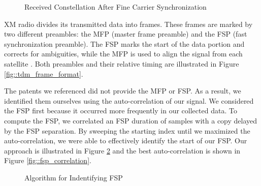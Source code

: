 \documentclass[conference,onecolumn]{IEEEtran}
\begin{document}
\begin{figure}[H]
	\centerline{}
	\caption{Received Constellation After Fine Carrier Synchronization}
	\label{fig::constellation_after_fine_carrier_comp}
\end{figure}

XM radio divides its transmitted data into frames. These frames are marked by two different preambles: the MFP (master frame preamble) and the FSP (fast synchronization preamble). The FSP marks the start of the data portion and corrects for ambiguities, while the MFP is used to align the signal from each satellite \cite{a2008_us8260192b2}. Both preambles and their relative timing are illustrated in Figure \ref{fig::tdm_frame_format}.

The patents we referenced did not provide the MFP or FSP. As a result, we identified them ourselves using the auto-correlation of our signal. We considered the FSP first because it occurred more frequently in our collected data. To compute the FSP, we correlated an FSP duration of samples with a copy delayed by the FSP separation. By sweeping the starting index until we maximized the auto-correlation, we were able to effectively identify the start of our FSP. Our approach is illustrated in Figure \ref{fig::finding_fsp} and the best auto-correlation is shown in Figure \ref{fig::fsp_correlation}.

\begin{figure}[H]
	\centerline{}
	\caption{Algorithm for Indentifying FSP}
	\label{fig::finding_fsp}
\end{figure}
\end{document}
